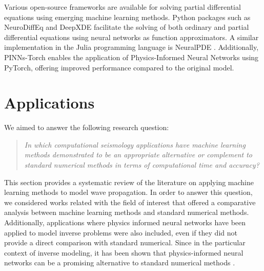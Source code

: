\documentclass[11pt,twoside]{article}
\begin{document}
Various open-source frameworks are available for solving partial differential equations using emerging machine learning methods. Python 
packages such as NeuroDiffEq \citep{chen2020neurodiffeq} and DeepXDE \citep{lu2021deepxde} facilitate the solving of both ordinary and 
partial differential equations using neural networks as function approximators. A similar implementation in the Julia programming language 
is NeuralPDE \citep{https://doi.org/10.48550/arxiv.2107.09443}. Additionally, PINNs-Torch \citep{bafghi_pinns-torch_2023} enables the 
application of Physics-Informed Neural Networks using PyTorch, offering improved performance compared to the original model.

\section{Applications}\label{sec:applications}

We aimed to answer the following research question:

\begin{quote}
\noindent\textit{In which computational seismology applications have machine learning methods demonstrated to be 
an appropriate alternative or complement to standard numerical methods in terms of computational time and accuracy?}\\
\end{quote}

This section provides a systematic review of the literature on applying machine learning methods to model 
wave propagation. In order to answer this question, we considered works related 
with the field of interest that offered a comparative analysis between machine learning methods and standard
numerical methods. Additionally, applications where physics informed neural networks have been applied to model
inverse problems were also included, even if they did not provide a direct comparison with standard numerical. 
Since in the particular context of inverse modeling, it has been shown that physics-informed neural networks 
can be a promising alternative to standard numerical methods \citep{haghighat_physics-informed_2021,
raissi_hidden_2020}.
\end{document}
